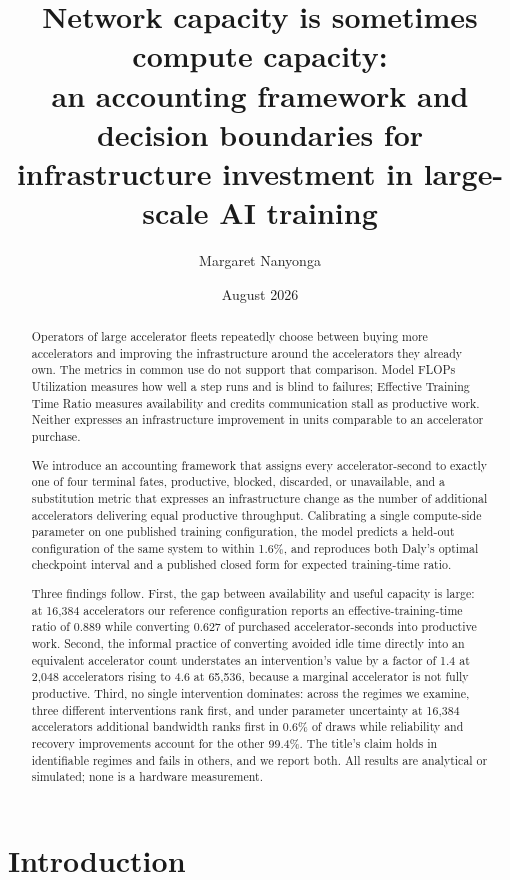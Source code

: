 \documentclass[11pt]{article}
\title{Network capacity is sometimes compute capacity:\\
an accounting framework and decision boundaries for\\
infrastructure investment in large-scale AI training}
\author{Margaret Nanyonga}
\date{August 2026}
\begin{document}
\maketitle

\begin{abstract}
Operators of large accelerator fleets repeatedly choose between buying more
accelerators and improving the infrastructure around the accelerators they
already own. The metrics in common use do not support that comparison. Model
FLOPs Utilization measures how well a step runs and is blind to failures;
Effective Training Time Ratio measures availability and credits communication
stall as productive work. Neither expresses an infrastructure improvement in
units comparable to an accelerator purchase.

We introduce an accounting framework that assigns every accelerator-second to
exactly one of four terminal fates, productive, blocked, discarded, or
unavailable, and a substitution metric that expresses an infrastructure change
as the number of additional accelerators delivering equal productive throughput.
Calibrating a single compute-side parameter on one published training
configuration, the model predicts a held-out configuration of the same system to
within 1.6\%, and reproduces both Daly's optimal checkpoint interval and a
published closed form for expected training-time ratio.

Three findings follow. First, the gap between availability and useful capacity
is large: at 16{,}384 accelerators our reference configuration reports an
effective-training-time ratio of 0.889 while converting 0.627 of purchased
accelerator-seconds into productive work. Second, the informal practice of
converting avoided idle time directly into an equivalent accelerator count
understates an intervention's value by a factor of 1.4 at 2{,}048 accelerators
rising to 4.6 at 65{,}536, because a marginal accelerator is not fully
productive. Third, no single intervention
dominates: across the regimes we examine, three different interventions rank
first, and under parameter uncertainty at 16{,}384 accelerators additional
bandwidth ranks first in 0.6\% of draws while reliability and recovery
improvements account for the other 99.4\%. The title's
claim holds in identifiable regimes and fails in others, and we report both.
All results are analytical or simulated; none is a hardware measurement.
\end{abstract}

\section{Introduction}
\end{document}
